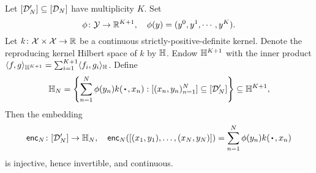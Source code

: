 \documentclass[12pt, twoside]{report}
\begin{document}
\begin{lemma} \label{lem:compact_injection}
    Let $[\mathcal{D}'_{N}] \subseteq [\mathcal{D}_N]$ have multiplicity $K$.
    Set
    \begin{equation}
        \phi\colon \mathcal{Y} \to \mathbb{R}^{K+1}, \quad
        \phi(y) = (y^0, y^1, \cdots, y^K).
    \end{equation}
    Let $k\colon \mathcal{X} \times \mathcal{X} \to \mathbb{R}$ be a continuous strictly-positive-definite kernel.
    Denote the reproducing kernel Hilbert space of $k$ by $\mathbb{H}$.
    Endow $\mathbb{H}^{K+1}$ with the inner product $\langle f, g\rangle_{\mathbb{H}^{K+1}} = \sum_{i=1}^{K+1} \langle f_i, g_i\rangle_{\mathbb{H}}$.
    Define
    \begin{equation}
        \Hb_{N} = \set*{
            \sum_{n=1}^N \phi(y_n) k(\vardot, x_n) :
            [(x_n, y_n)_{n=1}^N] \sub [\D'_N]
        }
        \subseteq \Hb^{K+1},
    \end{equation}
    Then the embedding
    \begin{equation}
        \enc_N \colon [\D'_{N}] \to \Hb_{N}, \quad
        \enc_N([(x_1, y_1), \ldots, (x_N, y_N)])
        = \sum_{n=1}^N \phi(y_n) k(\vardot, x_n)
    \end{equation}
    is injective, hence invertible, and continuous. 
\end{lemma}
\end{document}
